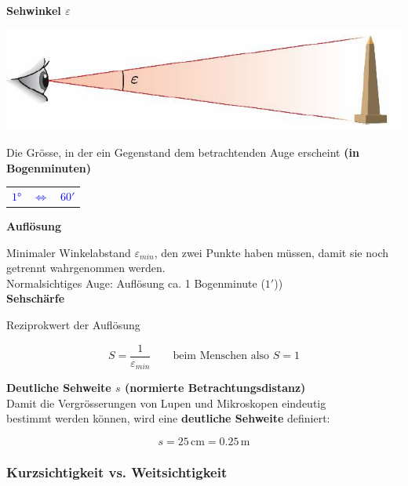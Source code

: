 \textbf{Sehwinkel $\varepsilon$}

\begin{minipage}{0.48\linewidth}
\includegraphics[width=0.9\linewidth]{Bilder/Wellen-Optik/sehwinkel}
\end{minipage}
\hfill
\begin{minipage}{0.48\linewidth}
Die Grösse, in der ein Gegenstand dem betrachtenden Auge erscheint \textbf{(in Bogenminuten)} \\

\begin{tabular}{l c l}
\textcolor{blue}{$1$°} & \textcolor{blue}{$\Leftrightarrow$} & \textcolor{blue}{$60'$} \\
\end{tabular}

\end{minipage}



\textbf{Auflösung} 

Minimaler Winkelabstand $\varepsilon _{min}$, den zwei Punkte haben müssen, damit sie noch getrennt wahrgenommen werden. \\
Normalsichtiges Auge: Auflösung ca. 1 Bogenminute ($1'$))\\


\textbf{Sehschärfe}

Reziprokwert der Auflösung

$$ \boxed{ S = \frac{1}{\varepsilon _{min}} \qquad \text{beim Menschen also } S = 1  } $$ 



\textbf{Deutliche Sehweite  $s$ (normierte Betrachtungsdistanz)} \\

Damit die Vergrösserungen von Lupen und Mikroskopen eindeutig \\
bestimmt werden können, wird eine \textbf{deutliche Sehweite} definiert:

$$ \boxed{ s = 25 \, \mathrm{cm} = 0.25 \, \mathrm{m}  } $$ 




\subsubsection{Kurzsichtigkeit vs. Weitsichtigkeit}


